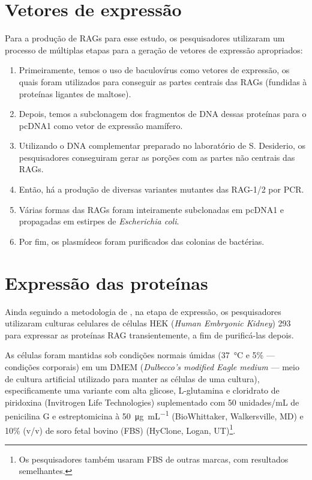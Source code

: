 \documentclass[
	12pt,				%
	openright,			%
	twoside,			%
	a4paper,			%
	]{abntex2}
\begin{document}
\section{Vetores de expressão}

Para a produção de RAGs para esse estudo, os pesquisadores utilizaram um processo de múltiplas etapas para a geração de vetores de expressão apropriados:
\begin{enumerate}[label=\roman*.]
	\item Primeiramente, temos o uso de baculovírus como vetores de expressão, os quais foram utilizados para conseguir as partes centrais das RAGs (fundidas à proteínas ligantes de maltose).
	\item Depois, temos a subclonagem dos fragmentos de DNA dessas proteínas para o pcDNA1 como vetor de expressão mamífero.
	\item Utilizando o DNA complementar preparado no laboratório de S. Desiderio, os pesquisadores conseguiram gerar as porções com as partes não centrais das RAGs.
	\item Então, há a produção de diversas variantes mutantes das RAG-1/2 por PCR.
	\item Várias formas das RAGs foram inteiramente subclonadas em pcDNA1 e propagadas em estirpes de \textit{Escherichia coli}.
	\item Por fim, os plasmídeos foram purificados das colonias de bactérias.
\end{enumerate}

\section{Expressão das proteínas}

Ainda seguindo a metodologia de , na etapa de expressão, os pesquisadores utilizaram culturas celulares de células HEK (\textit{Human Embryonic Kidney}) 293 para expressar as proteínas RAG transientemente, a fim de purificá-las depois.

As células foram mantidas sob condições normais úmidas (\SI{37}{\degreeCelsius} e 5\%  --- condições corporais) em um DMEM (\textit{Dulbecco's modified Eagle medium} --- meio de cultura artificial utilizado para manter as células de uma cultura), especificamente uma variante com alta glicose, L-glutamina e cloridrato de piridoxina (Invitrogen Life Technologies) suplementado com 50 unidades/\si{\milli\liter} de penicilina G e estreptomicina à \SI{50}{\micro\gram\per\milli\liter} (BioWhittaker, Walkersville, MD) e 10\% (v/v) de soro fetal bovino (FBS) (HyClone, Logan, UT)\footnote{Os pesquisadores também usaram FBS de outras marcas, com resultados semelhantes.}.
\end{document}
